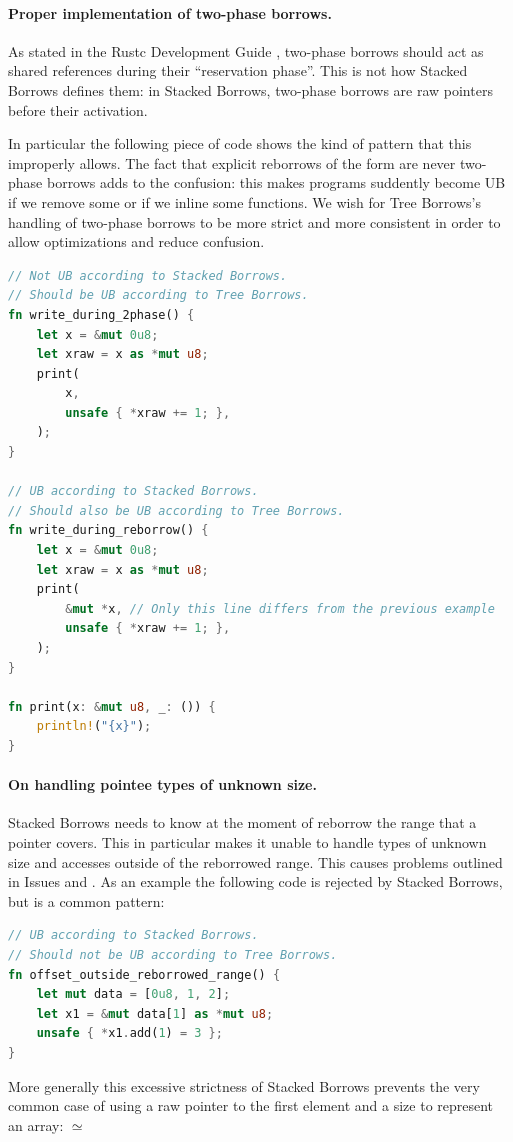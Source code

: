 \documentclass[a4paper,11pt]{article}
\theoremstyle{plain}
\theoremstyle{definition}
\theoremstyle{remark}
\newcommand{\tcode}[1]{\rstinline{#1}}
\begin{document}
\paragraph*{Proper implementation of two-phase borrows.}
As stated in the Rustc Development Guide \cite{rustc_dev_guide},
two-phase borrows should act as shared references during their ``reservation phase''.
This is not how Stacked Borrows defines them: in Stacked Borrows,
two-phase borrows are raw pointers before their activation.

In particular the following piece of code shows the kind of pattern that this
improperly allows. The fact that explicit reborrows of the form \tcode{\&mut *x}
are never two-phase borrows adds to the confusion: this makes programs suddently
become UB if we remove some \tcode{\&mut*} or if we inline some functions.
We wish for Tree Borrows's handling of two-phase borrows to be more strict and
more consistent in order to allow optimizations and reduce confusion.
\begin{lstlisting}[language=rust]
// Not UB according to Stacked Borrows.
// Should be UB according to Tree Borrows.
fn write_during_2phase() {
    let x = &mut 0u8;
    let xraw = x as *mut u8;
    print(
        x,
        unsafe { *xraw += 1; },
    );
}

// UB according to Stacked Borrows.
// Should also be UB according to Tree Borrows.
fn write_during_reborrow() {
    let x = &mut 0u8;
    let xraw = x as *mut u8;
    print(
        &mut *x, // Only this line differs from the previous example
        unsafe { *xraw += 1; },
    );
}

fn print(x: &mut u8, _: ()) {
    println!("{x}");
}
\end{lstlisting}

\paragraph*{On handling pointee types of unknown size.}
Stacked Borrows needs to know at the moment of reborrow the range that a pointer
covers. This in particular makes it unable to handle types of unknown size and
accesses outside of the reborrowed range. This causes problems outlined in Issues
\cite{issue_raw_range_strict} and \cite{issue_extern_type}.
As an example the following code is rejected by Stacked Borrows, but
is a common pattern:
\begin{lstlisting}[language=rust]
// UB according to Stacked Borrows.
// Should not be UB according to Tree Borrows.
fn offset_outside_reborrowed_range() {
    let mut data = [0u8, 1, 2];
    let x1 = &mut data[1] as *mut u8;
    unsafe { *x1.add(1) = 3 };
}
\end{lstlisting}
More generally this excessive strictness of Stacked Borrows prevents the very
common case of using a raw pointer to the first element and a size to represent an array:
\tcode{(*mut T, usize)} \(\simeq\) \tcode{&[T]}
\end{document}
